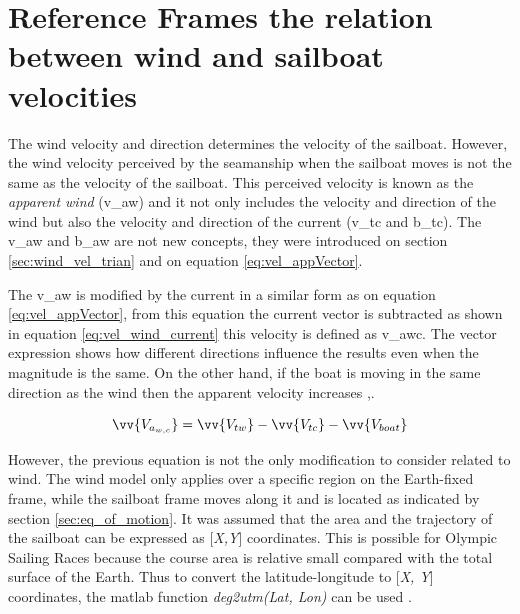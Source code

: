 \section{Reference Frames the relation between wind and sailboat velocities} \label{sec:RefFrames}

The wind velocity and direction determines the velocity of the sailboat. However, the wind velocity perceived by the seamanship when the sailboat moves is not the same as the velocity of the sailboat. This perceived velocity is known as the \textit{apparent wind} (\acrshort{v_aw}) and it not only includes the velocity and direction of the wind but also the velocity and direction of the current (\acrshort{v_tc} and \acrshort{b_tc}). The \acrshort{v_aw} and \acrshort{b_aw} are not new concepts, they were introduced on section \ref{sec:wind_vel_trian} and on equation \ref{eq:vel_appVector}. \par

The \acrshort{v_aw} is modified by the current in a similar form as on equation \ref{eq:vel_appVector}, from this equation the current vector is subtracted as shown in equation \ref{eq:vel_wind_current} this velocity is defined as \acrshort{v_awc}. The vector expression shows how different directions influence the results even when the magnitude is the same. On the other hand, if the boat is moving in the same direction as the wind then the apparent velocity increases \cite{denny2009float},\cite{allsopp1998stochastic}. \par 

\begin{equation} \label{eq:vel_wind_current}
\vv{V_{a_{w,c}}}= \vv{V_{tw}} -\vv{V_{tc}} - \vv{V_{boat}}
\end{equation}

However, the previous equation is not the only modification to consider related to wind. %
The wind model only applies over a specific region on the Earth-fixed frame, while the sailboat frame moves along it and is located as indicated by section \ref{sec:eq_of_motion}. It was assumed that the area and the trajectory of the sailboat can be expressed as [\textit{X,Y}] coordinates. This is possible for Olympic Sailing Races because the course area is relative small compared with the total surface of the Earth. Thus to convert the latitude-longitude to [\textit{X, Y}] coordinates, the \acrshort{matlab} function \textit{deg2utm(Lat, Lon)} can be used \cite{allsopp1998stochastic}.\par \noindent 

